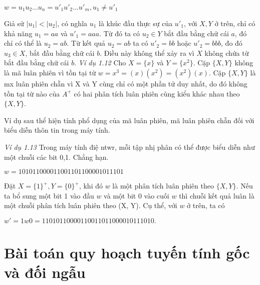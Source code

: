 $w = u_1u_2...u_n = u'_1u'_2...u'_m, u_1 \ne u'_1$
\begin{flushleft}
Giả sử $|u_1| < |u_2|$, có nghĩa $u_1$ là khúc đầu thực sự của $u'_1$, với $X,Y$ ở trên, chỉ có khả năng $u_1 = aa$ và $u'_1 = aaa$. Từ đó ta có $u_2 \in Y$ bắt đầu bằng chữ cái $a$, đó chỉ có thể là $u_2 = ab$. Từ kết quả $u_2 = ab$ ta có $u'_2 = bb$ hoặc $u'_2 = bbb$, đo đó $u_3 \in X$, bắt đầu bằng chữ cái $b$. Điều này không thể xảy ra vì $X$ không chứa từ bắt đầu bằng chữ cái $b$.
\textit{Ví dụ 1.12}     Cho $X = \{x\}$ và $Y = \{x^2\}$. Cặp $\{ X,Y \}$ không là mã luân phiên vì tồn tại từ $w = x^3 = (x)(x^2) = (x^2)(x)$. Cặp $\{ X,Y \}$ là mx luân phiên chẵn vì X và Y cùng chỉ có một phần tử duy nhất, do đó không tồn tại từ nào của $A^+$ có hai phân tích luân phiên cùng kiểu khác nhau theo $\{ X,Y \}$.

\hspace{10mm} Ví dụ sau thể hiện tính phổ dụng của mã luân phiên, mã luân phiên chẵn đối với biểu diễn thôn tin trong máy tính.

\hspace{10mm}\textit{Ví dụ 1.13}    Trong máy tính điệ ntwr, mỗi tập nhị phân có thể được biểu diễn như một chuỗi các bit 0,1. Chẳng hạn.
\end{flushleft}
$w = 101011000011001101100001011101$
\begin{flushleft}
\hspace{10mm}Đặt $X = \{ 1 \}^+, Y = \{0\}^+$, khi đó $w$ là một phân tích luân phiên theo $\{ X,Y \}$. Nếu ta bổ sung một bit 1 vào đầu $w$ và một bit 0 vào cuối $w$ thì chuỗi kết quả luân là một chuỗi phân tích luân phiên theo (X, Y). Cụ thể, với $w$ ở trên, ta có 
\end{flushleft}
$w′ = 1w0 = 11010110000110011011000010111010.$
\section{Bài toán quy hoạch tuyến tính gốc và đối ngẫu}
